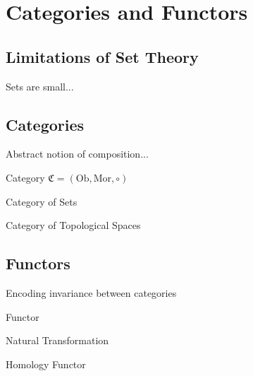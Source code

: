 \chapter{Categories and Functors}
\source
\section{Limitations of Set Theory}
Sets are small...

\section{Categories}
Abstract notion of composition...

\begin{definition}{Category}{}
$\mathfrak{C} = (\mathrm{Ob}, \mathrm{Mor}, \circ)$
\end{definition}

\begin{example}{Category of Sets}{}
\end{example}

\begin{example}{Category of Topological Spaces}{}
\end{example}

\section{Functors}
Encoding invariance between categories

\begin{definition}{Functor}{}
\end{definition}

\begin{example}{Natural Transformation}{}
\end{example}

\begin{example}{Homology Functor}{}
\end{example}